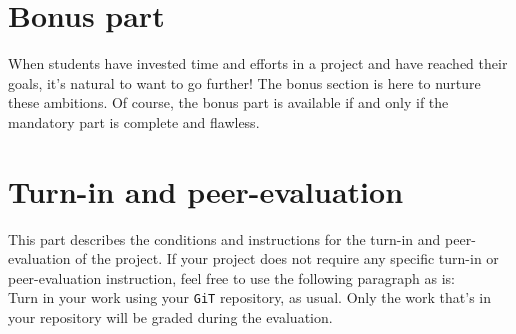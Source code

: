 \documentclass{42-en}
\begin{document}
\chapter{Bonus part}

    When students have invested time and efforts in a project and have reached
    their goals, it's natural to want to go further! The bonus section
    is here to nurture these ambitions. Of course, the bonus part is
    available if and only if the mandatory part is complete and flawless.



\chapter{Turn-in and peer-evaluation}

    This part describes the conditions and instructions for the turn-in and
    peer-evaluation of the project. If your project does not
    require any specific turn-in or peer-evaluation instruction, feel free to
    use the following paragraph as is:\\

    Turn in your work using your \texttt{GiT} repository, as
    usual. Only the work that's in your repository will be graded during
    the evaluation.



\end{document}
